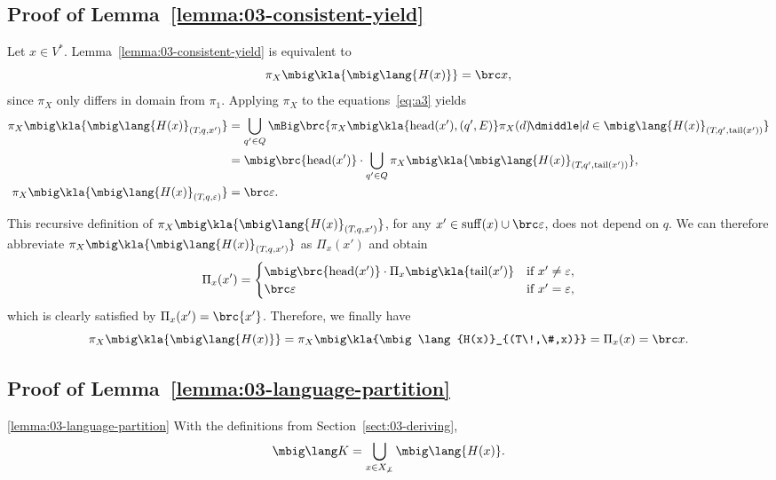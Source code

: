 \subsection{Proof of Lemma~\ref{lemma:03-consistent-yield}}

Let $x\in V^*$. Lemma~\ref{lemma:03-consistent-yield} is equivalent to
\[
 \pi_X\mbig\kla{\mbig\lang{H(x)}} = \brc x,
\]
since $\pi_X$ only differs in domain from $\pi_1$. Applying $\pi_X$
to the equations~\eqref{eq:a3} yields
\begin{align*}
 \pi_X\mbig\kla{\mbig\lang{H(x)}_{(T\!,q,x')}} &= \bigcup_{q'\in Q}\mBig\brc{\pi_X\mbig\kla{\car(x'),(q',E)}\pi_X(d) \!\dmiddle| d\in\mbig\lang{H(x)}_{(T\!,q',\cdr(x'))}} \\
 &= \mbig\brc{\car(x')} \cdot \bigcup_{q'\in Q} \pi_X\mbig\kla{\mbig\lang{H(x)}_{(T\!,q',\cdr(x'))}}, \\
 \pi_X\mbig\kla{\mbig\lang{H(x)}_{(T\!,q,\eps)}} &= \brc\eps.
\end{align*}

This recursive definition of $\pi_X\mbig\kla{\mbig\lang{H(x)}_{(T\!,q,x')}}$, for
any $x'\in\operatorname{suff}(x)\cup\brc\eps$, does not depend on $q$. We can therefore
abbreviate $\pi_X\mbig\kla{\mbig\lang{H(x)}_{(T\!,q,x')}}$ as $\Pi_x(x')$ and
obtain
\[
 \Pi_x(x') = \begin{cases}
  \mbig\brc{\car(x')} \cdot \Pi_x\mbig\kla{\cdr(x')} & \text{if } x'\neq\eps, \\
  \brc\eps & \text{if } x' = \eps,
 \end{cases}
\]
which is clearly satisfied by $\Pi_x(x') = \brc{x'}$. Therefore, we finally have
\[
 \pi_X\mbig\kla{\mbig\lang{H(x)}} = \pi_X\mbig\kla{\mbig\lang{H(x)}_{(T\!,\#,x)}} = \Pi_x(x) = \brc x.
\]

\subsection{Proof of Lemma~\ref{lemma:03-language-partition}}

\begin{repeatlemma}{\ref{lemma:03-language-partition}}
 With the definitions from Section~\ref{sect:03-deriving},
 \[
  \mbig\lang K = \bigcup_{x\in X_{\not\bot}} \mbig\lang{H(x)}.
 \]
\end{repeatlemma}

